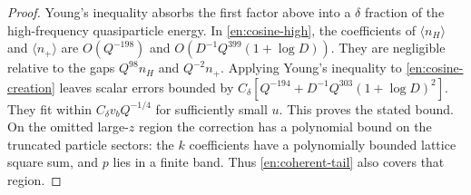 \begin{proof}
Young's inequality absorbs the first factor above into a $\delta$
fraction of the high-frequency quasiparticle energy.  In
\eqref{en:cosine-high}, the coefficients of $\langle n_H\rangle$ and
$\langle n_+\rangle$ are $O(Q^{-198})$ and
$O(D^{-1}Q^{399}(1+\log D))$.  They are negligible relative to the gaps
$Q^{98}n_H$ and $Q^{-2}n_+$.  Applying Young's inequality to
\eqref{en:cosine-creation} leaves scalar errors bounded by
$C_\delta[Q^{-194}+D^{-1}Q^{303}(1+\log D)^2]$.
They fit within $C_\delta v_bQ^{-1/4}$ for sufficiently small $u$.
This proves the stated bound.  On the omitted large-$z$ region the
correction has a polynomial bound on the truncated particle sectors:
the $k$ coefficients have a polynomially bounded lattice square sum,
and $p$ lies in a finite band.  Thus \eqref{en:coherent-tail} also covers
that region.
\end{proof}




